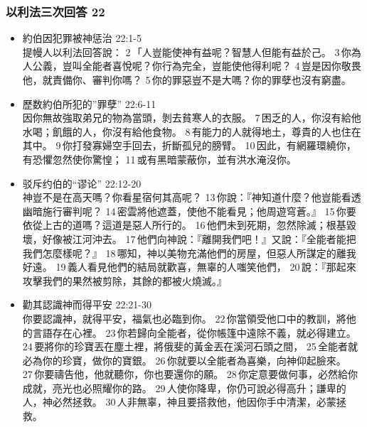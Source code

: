 \subsubsection{以利法三次回答 22}
\begin{itemize}
\itemsep-.45em 
\item 約伯因犯罪被神惩治 22:1-5\\
提幔人以利法回答說： 2 「人豈能使神有益呢？智慧人但能有益於己。 3 你為人公義，豈叫全能者喜悅呢？你行為完全，豈能使他得利呢？ 4 豈是因你敬畏他，就責備你、審判你嗎？ 5 你的罪惡豈不是大嗎？你的罪孽也沒有窮盡。
\item 歷数約伯所犯的''罪孽'' 22:6-11\\
因你無故強取弟兄的物為當頭，剝去貧寒人的衣服。 7 困乏的人，你沒有給他水喝；飢餓的人，你沒有給他食物。 8 有能力的人就得地土，尊貴的人也住在其中。 9 你打發寡婦空手回去，折斷孤兒的膀臂。 10 因此，有網羅環繞你，有恐懼忽然使你驚惶； 11 或有黑暗蒙蔽你，並有洪水淹沒你。
\item 驳斥约伯的“谬论” 22:12-20\\
神豈不是在高天嗎？你看星宿何其高呢？ 13 你說：『神知道什麼？他豈能看透幽暗施行審判呢？ 14 密雲將他遮蓋，使他不能看見；他周遊穹蒼。』 15 你要依從上古的道嗎？這道是惡人所行的。 16 他們未到死期，忽然除滅；根基毀壞，好像被江河沖去。 17 他們向神說：『離開我們吧！』又說：『全能者能把我們怎麼樣呢？』 18 哪知，神以美物充滿他們的房屋，但惡人所謀定的離我好遠。 19 義人看見他們的結局就歡喜，無辜的人嗤笑他們， 20 說：『那起來攻擊我們的果然被剪除，其餘的都被火燒滅。』
\item 勸其認識神而得平安 22:21-30\\
你要認識神，就得平安，福氣也必臨到你。 22 你當領受他口中的教訓，將他的言語存在心裡。 23 你若歸向全能者，從你帳篷中遠除不義，就必得建立。 24 要將你的珍寶丟在塵土裡，將俄斐的黃金丟在溪河石頭之間， 25 全能者就必為你的珍寶，做你的寶銀。 26 你就要以全能者為喜樂，向神仰起臉來。 27 你要禱告他，他就聽你，你也要還你的願。 28 你定意要做何事，必然給你成就，亮光也必照耀你的路。 29 人使你降卑，你仍可說必得高升；謙卑的人，神必然拯救。 30 人非無辜，神且要搭救他，他因你手中清潔，必蒙拯救。
\end{itemize}

